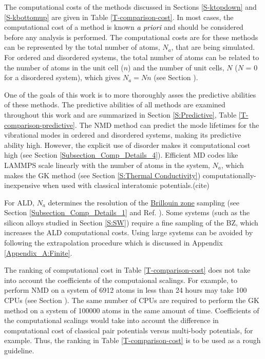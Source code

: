 The computational costs of the methods discussed in Sections 
\ref{S-ktopdown} and \ref{S-kbottomup}  
are given in Table \ref{T-comparison-cost}.  
In most cases, the 
computational cost of a method is known $\emph{a priori}$ and should 
be considered before any analysis is performed. The computational 
costs are for these methods can be represented by the total number of 
atoms, $N_a$, that are being simulated. For ordered and disordered 
systems, the total 
number of atoms can be related to the number of atoms in the unit 
cell ($n$) and the 
number of unit cells, $N$ ($N$ = 0 for a disordered system), 
which gives $N_a = N n$ (see Section ).

One of the goals 
of this work is to more thoroughly asses the predictive 
abilities of these methods.
The predictive abilities of all methods are examined throughout 
this work and are summarized in Section \ref{S:Predictive}, 
Table \ref{T-comparison-predictive}. 
The NMD method can predict the mode lifetimes for the vibrational 
modes in ordered and disordered systems, making its predictive 
ability high.
\cite{ladd_lattice_1986,mcgaughey_quantitative_2004,donadio_thermal_2007,
henry_spectral_2008,donadio_atomistic_2009,turney_predicting_2009,
goicochea_thermal_2010,he_morphology_2011,he_thermal_2011,he_heat_2011,
he_lattice_2012,sosso_thermal_2012,qiu_molecular_2012,wang_mode-wise_2013,
bao_first-principles_2013} 
However, the explicit use of disorder makes it 
computational cost high (see Section \ref{Subsection_Comp_Details_4}). 
Efficient MD 
codes like LAMMPS scale linearly with the number of atoms in 
the system, $N_a$, which makes the GK method (see Section 
\ref{S:Thermal Conductivity}) 
computationally-inexpensive when used with classical interatomic 
potentials.(cite) 
 
For ALD, $N_a$ determines the resolution of the 
\href{https://en.wikipedia.org/wiki/Brillouin_zone}
{Brillouin zone} sampling (see Section \ref{Subsection_Comp_Details_1} 
and Ref. ). Some systems (such as 
the silicon alloys studied in Section \ref{S:SW}) 
require a fine sampling 
of the BZ, which increases the ALD computational costs. Using large 
systems can be avoided by following the extrapolation procedure 
which is discussed in Appendix \ref{Appendix_A:Finite}.

The ranking of computational cost in Table \ref{T-comparison-cost} 
does not take into account the coefficients of the computaional 
scalings. For example, to perform NMD 
on a system of 6912 atoms in less than 24 hours may take 100 
CPUs (see Section ). The same number of CPUs are required to perform 
the GK method on a system of 100000 atoms in the same amount of time. 
Coefficients of the computational scalings would take into 
account the difference in computational cost of classical pair 
potentials versus multi-body potentials, for example. 
Thus, the ranking in Table \ref{T-comparison-cost} is to be used as a 
rough guideline. 

